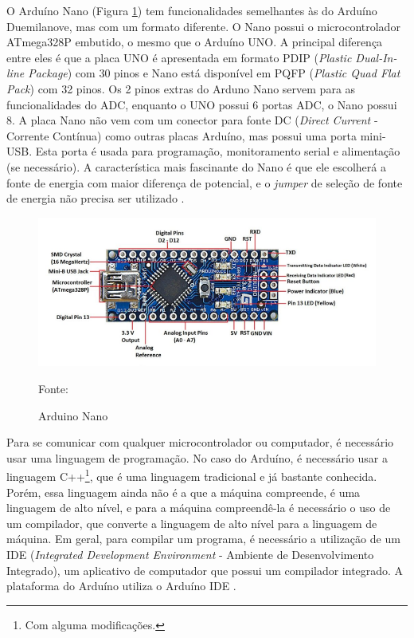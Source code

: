 O Arduíno Nano (Figura \ref{arduino}) tem funcionalidades  semelhantes às do Arduíno Duemilanove, mas com um formato diferente. O Nano possui o microcontrolador ATmega328P embutido, o mesmo que o Arduíno UNO. A principal diferença entre eles é que a placa UNO é apresentada em formato PDIP (\textit{Plastic Dual-In-line Package}) com 30 pinos e Nano está disponível em PQFP (\textit{Plastic Quad Flat Pack}) com 32 pinos. Os 2 pinos extras do Arduno Nano servem para as funcionalidades do ADC, enquanto o UNO possui 6 portas ADC, o Nano possui 8. A placa Nano não vem com um conector para fonte DC (\textit{Direct Current} - Corrente Contínua) como outras placas Arduíno, mas possui uma porta mini-USB. Esta porta é usada para programação, monitoramento serial e alimentação (se necessário). A característica mais fascinante do Nano é que ele escolherá a fonte de energia com maior diferença de potencial, e o \textit{jumper} de seleção de fonte de energia não precisa ser utilizado \cite{john2018}.  

\begin{figure}[h!]
	\centering
	\includegraphics[keepaspectratio=true,scale=0.77
	]{figuras/arduino_nano.png}
	\caption{ Arduino Nano }
	Fonte: \cite{john2018}
	\label{arduino}	
\end{figure}

Para se comunicar com qualquer microcontrolador ou computador, é necessário usar uma linguagem de programação. No caso do Arduíno, é necessário usar a linguagem C++\footnote{Com alguma modificações.}, que é uma linguagem tradicional e já bastante conhecida. Porém, essa linguagem ainda não é a que a máquina compreende, é uma linguagem de alto nível, e para a máquina compreendê-la é necessário o uso de um compilador, que converte a linguagem de alto nível para a linguagem de máquina. Em geral, para compilar um programa, é necessário a utilização de um IDE (\textit{Integrated Development Environment} - Ambiente de Desenvolvimento Integrado), um aplicativo de computador que possui um compilador integrado. A plataforma do Arduíno utiliza o Arduíno IDE \cite{chavier2016}. 

